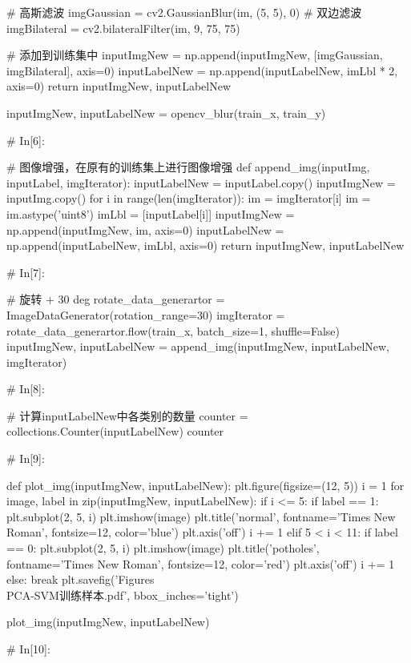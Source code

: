 \documentclass{MathorCupmodeling}
\begin{document}
\begin{python}
        # 高斯滤波
        imgGaussian = cv2.GaussianBlur(im, (5, 5), 0)
        # 双边滤波
        imgBilateral = cv2.bilateralFilter(im, 9, 75, 75)

        # 添加到训练集中
        inputImgNew = np.append(inputImgNew, [imgGaussian, imgBilateral], axis=0)
        inputLabelNew = np.append(inputLabelNew, imLbl * 2, axis=0)
    return inputImgNew, inputLabelNew


inputImgNew, inputLabelNew = opencv_blur(train_x, train_y)


# In[6]:


# 图像增强，在原有的训练集上进行图像增强
def append_img(inputImg, inputLabel, imgIterator):
    inputLabelNew = inputLabel.copy()
    inputImgNew = inputImg.copy()
    for i in range(len(imgIterator)):
        im = imgIterator[i]
        im = im.astype('uint8')
        imLbl = [inputLabel[i]]
        inputImgNew = np.append(inputImgNew, im, axis=0)
        inputLabelNew = np.append(inputLabelNew, imLbl, axis=0)
    return inputImgNew, inputLabelNew


# In[7]:


# 旋转 + 30 deg
rotate_data_generartor = ImageDataGenerator(rotation_range=30)
imgIterator = rotate_data_generartor.flow(train_x, batch_size=1, shuffle=False)
inputImgNew, inputLabelNew = append_img(inputImgNew, inputLabelNew, imgIterator)

# In[8]:


# 计算inputLabelNew中各类别的数量
counter = collections.Counter(inputLabelNew)
counter


# In[9]:


def plot_img(inputImgNew, inputLabelNew):
    plt.figure(figsize=(12, 5))
    i = 1
    for image, label in zip(inputImgNew, inputLabelNew):
        if i <= 5:
            if label == 1:
                plt.subplot(2, 5, i)
                plt.imshow(image)
                plt.title('normal', fontname='Times New Roman', fontsize=12, color='blue')
                plt.axis('off')
                i += 1
        elif 5 < i < 11:
            if label == 0:
                plt.subplot(2, 5, i)
                plt.imshow(image)
                plt.title('potholes', fontname='Times New Roman', fontsize=12, color='red')
                plt.axis('off')
                i += 1
        else:
            break
    plt.savefig('Figures\\PCA-SVM训练样本.pdf', bbox_inches='tight')


plot_img(inputImgNew, inputLabelNew)

# In[10]:



\end{python}
\end{document}

